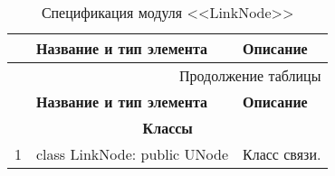 \small
\singlespacing
\begin{longtable}[h]{|p{}|p{}|p{}|}
  \caption{Спецификация модуля <<LinkNode>>}
	\\ \hline
	  \textbf{\No}                  &
	  \textbf{Название и тип элемента}  &
	  \textbf{Описание}
	\\ \hline
  \endfirsthead

  \multicolumn{3}{r}{Продолжение таблицы \thetable{}}
  \\ \hline
	  \textbf{\No}                  &
	  \textbf{Название и тип элемента}  &
	  \textbf{Описание}
	\\ \hline
  \endhead

  \multicolumn{3}{|c|}{\textbf{Классы}} \\
  \hline
  1 & class LinkNode: public UNode & Класс связи. \\ \hline
\end{longtable}
\normalsize
\onehalfspacing

